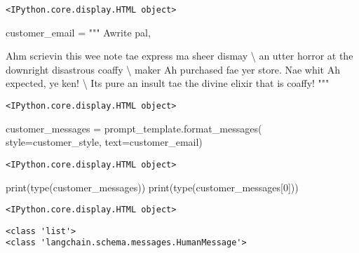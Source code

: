 \documentclass[
  letterpaper,
  DIV=11,
  numbers=noendperiod]{scrreprt}
\newenvironment{Shaded}{\begin{snugshade}}{\end{snugshade}}
\newcommand{\BuiltInTok}[1]{\textcolor[rgb]{0.00,0.23,0.31}{#1}}
\newcommand{\CharTok}[1]{\textcolor[rgb]{0.13,0.47,0.30}{#1}}
\newcommand{\DecValTok}[1]{\textcolor[rgb]{0.68,0.00,0.00}{#1}}
\newcommand{\NormalTok}[1]{\textcolor[rgb]{0.00,0.23,0.31}{#1}}
\newcommand{\OperatorTok}[1]{\textcolor[rgb]{0.37,0.37,0.37}{#1}}
\newcommand{\StringTok}[1]{\textcolor[rgb]{0.13,0.47,0.30}{#1}}
\begin{document}
\begin{verbatim}
<IPython.core.display.HTML object>
\end{verbatim}

\begin{Shaded}
\begin{Highlighting}[]
\NormalTok{customer\_email }\OperatorTok{=} \StringTok{"""}
\StringTok{Awrite pal,}

\StringTok{Ah\textquotesingle{}m scrievin\textquotesingle{} this wee note tae express ma sheer dismay }\CharTok{\textbackslash{}}
\StringTok{an\textquotesingle{} utter horror at the downright disastrous coaffy }\CharTok{\textbackslash{}}
\StringTok{maker Ah purchased fae yer store. Nae whit Ah expected, ye ken! }\CharTok{\textbackslash{}}
\StringTok{It\textquotesingle{}s pure an insult tae the divine elixir that is coaffy!}
\StringTok{"""}
\end{Highlighting}
\end{Shaded}

\begin{verbatim}
<IPython.core.display.HTML object>
\end{verbatim}

\begin{Shaded}
\begin{Highlighting}[]
\NormalTok{customer\_messages }\OperatorTok{=}\NormalTok{ prompt\_template.format\_messages(}
\NormalTok{                    style}\OperatorTok{=}\NormalTok{customer\_style,}
\NormalTok{                    text}\OperatorTok{=}\NormalTok{customer\_email)}
\end{Highlighting}
\end{Shaded}

\begin{verbatim}
<IPython.core.display.HTML object>
\end{verbatim}

\begin{Shaded}
\begin{Highlighting}[]
\BuiltInTok{print}\NormalTok{(}\BuiltInTok{type}\NormalTok{(customer\_messages))}
\BuiltInTok{print}\NormalTok{(}\BuiltInTok{type}\NormalTok{(customer\_messages[}\DecValTok{0}\NormalTok{]))}
\end{Highlighting}
\end{Shaded}

\begin{verbatim}
<IPython.core.display.HTML object>
\end{verbatim}

\begin{verbatim}
<class 'list'>
<class 'langchain.schema.messages.HumanMessage'>
\end{verbatim}
\end{document}
